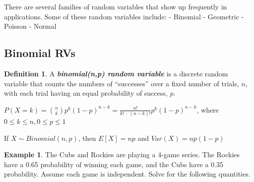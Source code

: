 \documentclass[
  11pt,
]{book}
\theoremstyle{definition}
\newtheorem{definition}{Definition}[chapter]
\theoremstyle{definition}
\newtheorem{example}{Example}[chapter]
\theoremstyle{definition}
\theoremstyle{definition}
\theoremstyle{remark}
\begin{document}
There are several families of random variables that show up frequently in applications. Some of these random variables include:
- Binomial
- Geometric
- Poisson
- Normal

\hypertarget{binomial-rvs}{%
\subsection{Binomial RVs}\label{binomial-rvs}}

\begin{definition}
A \textbf{\emph{binomial(n,p) random variable}} is a discrete random variable that counts the numbers of ``successes'' over a fixed number of trials, \(n\), with each trial having an equal probability of success, \(p\).

\(P(X=k) = \binom{n}{k} p^k(1-p)^{n-k} = \frac{n!}{k!\ \cdot\ (n-k)!} p^k(1-p)^{n-k}\), where \(0 \leq k \leq n, 0 \leq p \leq 1\)

If \(X \sim Binomial(n,p)\), then \(E[X]=np\) and \(Var(X)=np(1-p)\)
\end{definition}

\begin{example}
The Cubs and Rockies are playing a 4-game series. The Rockies have a 0.65 probability of winning each game, and the Cubs have a 0.35 probability. Assume each game is independent. Solve for the following quantities.
\end{example}
\end{document}
